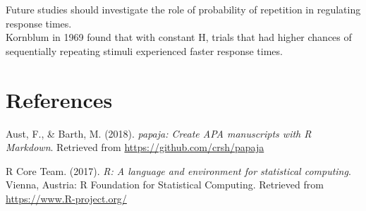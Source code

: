 \documentclass[man]{apa6}
\theoremstyle{definition}
\theoremstyle{definition}
\theoremstyle{definition}
\theoremstyle{remark}
\begin{document}
Future studies should investigate the role of probability of repetition
in regulating response times.\\
Kornblum in 1969 found that with constant H, trials that had higher
chances of sequentially repeating stimuli experienced faster response
times.

\newpage

\section{References}\label{references}

\begingroup
\setlength{\parindent}{-0.5in} \setlength{\leftskip}{0.5in}

\hypertarget{refs}{}
\hypertarget{ref-R-papaja}{}
Aust, F., \& Barth, M. (2018). \emph{papaja: Create APA manuscripts with
R Markdown}. Retrieved from \url{https://github.com/crsh/papaja}

\hypertarget{ref-R-base}{}
R Core Team. (2017). \emph{R: A language and environment for statistical
computing}. Vienna, Austria: R Foundation for Statistical Computing.
Retrieved from \url{https://www.R-project.org/}

\endgroup
\end{document}
